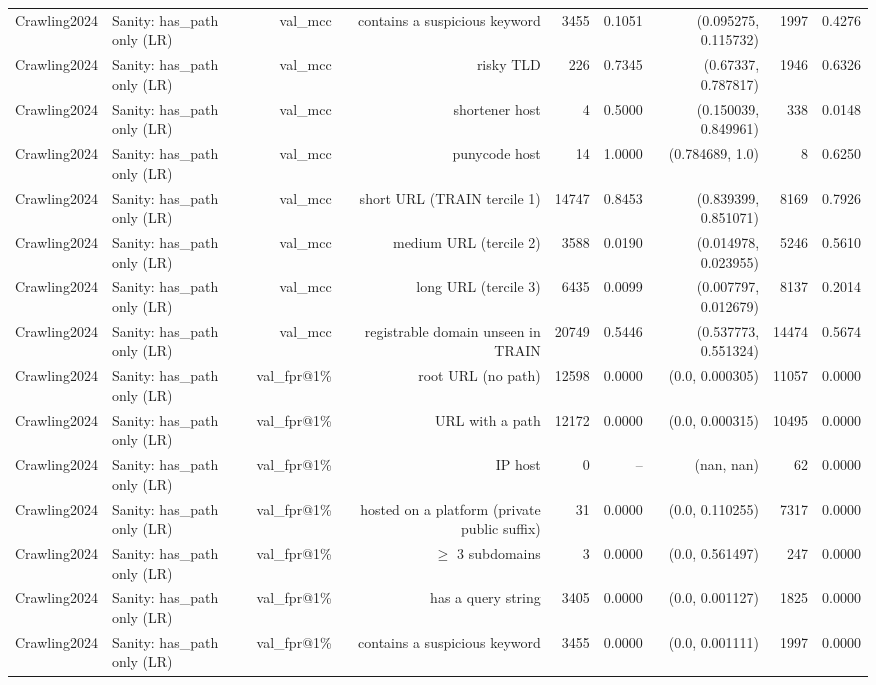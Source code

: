 \begin{table}[t]
\begin{tabular}{llrrrrrrr}
Crawling2024 & Sanity: has\_path only (LR) & val\_mcc & contains a suspicious keyword & 3455 & 0.1051 & (0.095275, 0.115732) & 1997 & 0.4276 \\
Crawling2024 & Sanity: has\_path only (LR) & val\_mcc & risky TLD & 226 & 0.7345 & (0.67337, 0.787817) & 1946 & 0.6326 \\
Crawling2024 & Sanity: has\_path only (LR) & val\_mcc & shortener host & 4 & 0.5000 & (0.150039, 0.849961) & 338 & 0.0148 \\
Crawling2024 & Sanity: has\_path only (LR) & val\_mcc & punycode host & 14 & 1.0000 & (0.784689, 1.0) & 8 & 0.6250 \\
Crawling2024 & Sanity: has\_path only (LR) & val\_mcc & short URL (TRAIN tercile 1) & 14747 & 0.8453 & (0.839399, 0.851071) & 8169 & 0.7926 \\
Crawling2024 & Sanity: has\_path only (LR) & val\_mcc & medium URL (tercile 2) & 3588 & 0.0190 & (0.014978, 0.023955) & 5246 & 0.5610 \\
Crawling2024 & Sanity: has\_path only (LR) & val\_mcc & long URL (tercile 3) & 6435 & 0.0099 & (0.007797, 0.012679) & 8137 & 0.2014 \\
Crawling2024 & Sanity: has\_path only (LR) & val\_mcc & registrable domain unseen in TRAIN & 20749 & 0.5446 & (0.537773, 0.551324) & 14474 & 0.5674 \\
Crawling2024 & Sanity: has\_path only (LR) & val\_fpr@1\% & root URL (no path) & 12598 & 0.0000 & (0.0, 0.000305) & 11057 & 0.0000 \\
Crawling2024 & Sanity: has\_path only (LR) & val\_fpr@1\% & URL with a path & 12172 & 0.0000 & (0.0, 0.000315) & 10495 & 0.0000 \\
Crawling2024 & Sanity: has\_path only (LR) & val\_fpr@1\% & IP host & 0 & -- & (nan, nan) & 62 & 0.0000 \\
Crawling2024 & Sanity: has\_path only (LR) & val\_fpr@1\% & hosted on a platform (private public suffix) & 31 & 0.0000 & (0.0, 0.110255) & 7317 & 0.0000 \\
Crawling2024 & Sanity: has\_path only (LR) & val\_fpr@1\% & $\geq$ 3 subdomains & 3 & 0.0000 & (0.0, 0.561497) & 247 & 0.0000 \\
Crawling2024 & Sanity: has\_path only (LR) & val\_fpr@1\% & has a query string & 3405 & 0.0000 & (0.0, 0.001127) & 1825 & 0.0000 \\
Crawling2024 & Sanity: has\_path only (LR) & val\_fpr@1\% & contains a suspicious keyword & 3455 & 0.0000 & (0.0, 0.001111) & 1997 & 0.0000 \\

\end{tabular}
\end{table}
